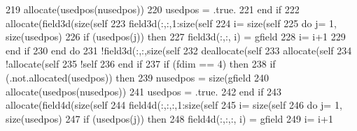 \begin{DoxyCode}
{{{{{{219                 \textcolor{keyword}{allocate}(usedpos(nusedpos))
220                 usedpos = .true.
221 \textcolor{keywordflow}{            end if}
222             \textcolor{keyword}{allocate}(field3d(\textcolor{keyword}{size}(self%
223             field3d(:,:,1:\textcolor{keyword}{size}(self%
224             i= \textcolor{keyword}{size}(self%
225             \textcolor{keywordflow}{do} j= 1, \textcolor{keyword}{size}(usedpos)
226                 \textcolor{keywordflow}{if} (usedpos(j)) \textcolor{keywordflow}{then}
227                     field3d(:,:, i) = gfield%
228                     i= i+1
229 \textcolor{keywordflow}{                end if}
230 \textcolor{keywordflow}{            end do}
231             \textcolor{comment}{!field3d(:,:,size(self%
232             \textcolor{keyword}{deallocate}(self%
233             \textcolor{keyword}{allocate}(self%
234             \textcolor{comment}{!allocate(self%
235             \textcolor{comment}{!self%
236 \textcolor{keywordflow}{        end if}
237         \textcolor{keywordflow}{if} (fdim == 4) \textcolor{keywordflow}{then}
238             \textcolor{keywordflow}{if} (.not.\textcolor{keyword}{allocated}(usedpos)) \textcolor{keywordflow}{then}
239                 nusedpos = \textcolor{keyword}{size}(gfield%
240                 \textcolor{keyword}{allocate}(usedpos(nusedpos))
241                 usedpos = .true.
242 \textcolor{keywordflow}{            end if}
243             \textcolor{keyword}{allocate}(field4d(\textcolor{keyword}{size}(self%
244             field4d(:,:,:,1:\textcolor{keyword}{size}(self%
245              i= \textcolor{keyword}{size}(self%
246             \textcolor{keywordflow}{do} j= 1, \textcolor{keyword}{size}(usedpos)
247                 \textcolor{keywordflow}{if} (usedpos(j)) \textcolor{keywordflow}{then}
248                     field4d(:,:,:, i) = gfield%
249                     i= i+1
}}}}}}}}}
\end{DoxyCode}
